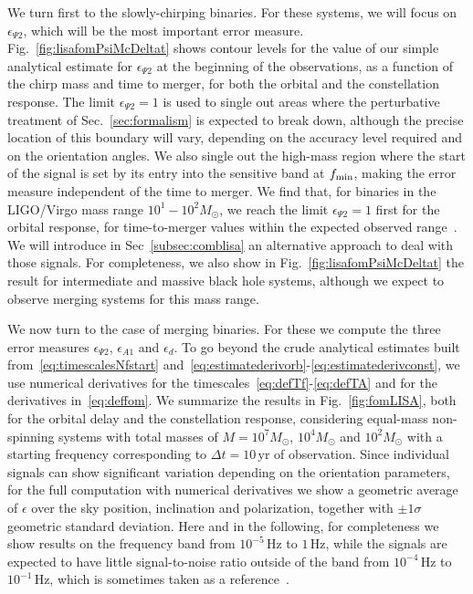\documentclass[aps,showpacs,twocolumn,
prd,superscriptaddress,nofootinbib]{revtex4-1}
\newcommand{\Hz}{\,\mathrm{Hz}}
\newcommand{\yr}{\,\mathrm{yr}}
\newcommand{\Msol}{M_{\odot}}
\begin{document}
We turn first to the slowly-chirping binaries. For these systems, we will focus on $\epsilon_{\Psi 2}$, which will be the most important error measure. Fig.~\ref{fig:lisafomPsiMcDeltat} shows contour levels for the value of our simple analytical estimate for $\epsilon_{\Psi 2}$ at the beginning of the observations, as a function of the chirp mass and time to merger, for both the orbital and the constellation response. The limit $\epsilon_{\Psi 2} = 1$ is used to single out areas where the perturbative treatment of Sec.~\ref{sec:formalism} is expected to break down, although the precise location of this boundary will vary, depending on the accuracy level required and on the orientation angles. We also single out the high-mass region where the start of the signal is set by its entry into the sensitive band at $f_{\rm min}$, making the error measure independent of the time to merger. We find that, for binaries in the LIGO/Virgo mass range $10^{1}-10^{2} \Msol$, we reach the limit $\epsilon_{\Psi 2}=1$ first for the orbital response, for time-to-merger values within the expected observed range~\cite{Sesana16}. We will introduce in Sec~\ref{subsec:comblisa} an alternative approach to deal with those signals. For completeness, we also show in Fig.~\ref{fig:lisafomPsiMcDeltat} the result for intermediate and massive black hole systems, although we expect to observe merging systems for this mass range. 

We now turn to the case of merging binaries. For these we compute the three error measures $\epsilon_{\Psi 2}$, $\epsilon_{A1}$ and $\epsilon_{d}$. To go beyond the crude analytical estimates built from~\eqref{eq:timescalesNfstart} and~\eqref{eq:estimatederivorb}-\eqref{eq:estimatederivconst}, we use numerical derivatives for the timescales~\eqref{eq:defTf}-\eqref{eq:defTA} and for the derivatives in~\eqref{eq:deffom}. We summarize the results in Fig.~\ref{fig:fomLISA}, both for the orbital delay and the constellation response, considering equal-mass non-spinning systems with total masses of $M=10^{7} \Msol$, $10^{4} \Msol$ and $10^{2} \Msol$ with a starting frequency corresponding to $\Delta t =10 \yr$ of observation. Since individual signals can show significant variation depending on the orientation parameters, for the full computation with numerical derivatives we show a geometric average of $\epsilon$ over the sky position, inclination and polarization, together with $\pm 1\sigma$ geometric standard deviation. Here and in the following, for completeness we show results on the frequency band from $10^{-5}\Hz$ to $1\Hz$, while the signals are expected to have little signal-to-noise ratio outside of the band from $10^{-4}\Hz$ to $10^{-1}\Hz$, which is sometimes taken as a reference~\cite{LISA17}.
\end{document}
